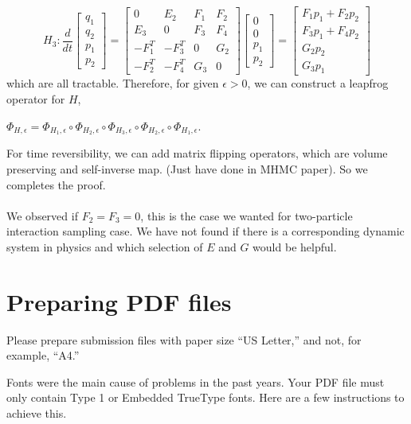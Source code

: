 \documentclass{article}
\begin{document}
\[
H_3 : \frac{d}{dt}
\left[
\begin{array}{ccc}
q_1 \\
q_2 \\
p_1 \\
p_2 
\end{array}
\right]
=
\left[
\begin{array}{cclcc}
0 & E_{2} & F_{1} & F_{2} \\
E_3 & 0& F_3 & F_4 \\
-F_1^T & -F_3^T & 0 & G_2 \\
-F_2^T & -F_4^T & G_3 & 0 
\end{array}
\right]
\left[
\begin{array}{ccc}
0\\
0  \\
p_1 \\
p_2
\end{array}
\right]
=
\left[
\begin{array}{ccc}
F_1 p_1 + F_2 p_2  \\
F_3 p_1 + F_4 p_2  \\
G_2 p_2 \\
G_3 p_1 
\end{array}
\right]
\] 
which are all tractable. Therefore, for given $\epsilon > 0$, we can construct a leapfrog operator for $H$,
\begin{center}
$\displaystyle\Phi_{H,\epsilon} = \Phi_{H_1,\epsilon} \circ \Phi_{H_2,\epsilon} \circ \Phi_{H_3,\epsilon} \circ \Phi_{H_2,\epsilon} \circ \Phi_{H_1,\epsilon}$.
\end{center}
For time reversibility, we can add matrix flipping operators, which are volume preserving and self-inverse map. (Just have done in MHMC paper). So we completes the proof.
\\
\\
We observed if $F_2 = F_3 = 0$, this is the case we wanted for two-particle interaction sampling case. We have not found if there is a corresponding dynamic system in physics and which selection of $E$ and $G$ would be helpful.

\section{Preparing PDF files}

Please prepare submission files with paper size ``US Letter,'' and not, for
example, ``A4.''

Fonts were the main cause of problems in the past years. Your PDF file must only
contain Type 1 or Embedded TrueType fonts. Here are a few instructions to
achieve this.
\end{document}
